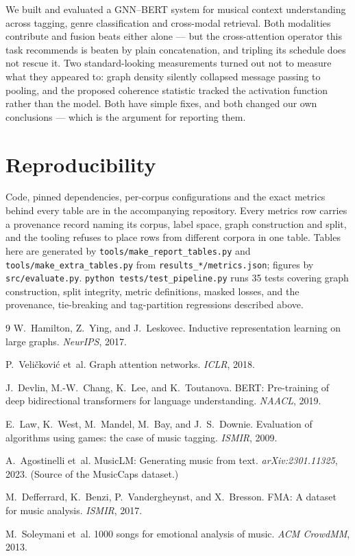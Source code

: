 \documentclass[10pt]{article}
\begin{document}
We built and evaluated a GNN--BERT system for musical context understanding
across tagging, genre classification and cross-modal retrieval. Both modalities
contribute and fusion beats either alone --- but the cross-attention operator
this task recommends is beaten by plain concatenation, and tripling its schedule
does not rescue it. Two standard-looking measurements turned out not to measure
what they appeared to: graph density silently collapsed message passing to
pooling, and the proposed coherence statistic tracked the activation function
rather than the model. Both have simple fixes, and both changed our own
conclusions --- which is the argument for reporting them.

\vspace{-0.3em}
\section*{Reproducibility}

Code, pinned dependencies, per-corpus configurations and the exact metrics
behind every table are in the accompanying repository. Every metrics row carries
a provenance record naming its corpus, label space, graph construction and
split, and the tooling refuses to place rows from different corpora in one table.
Tables here are generated by \texttt{tools/make\_report\_tables.py} and
\texttt{tools/make\_extra\_tables.py} from \texttt{results\_*/metrics.json};
figures by \texttt{src/evaluate.py}. \texttt{python tests/test\_pipeline.py} runs
35 tests covering graph construction, split integrity, metric definitions, masked
losses, and the provenance, tie-breaking and tag-partition regressions described
above.

\vspace{-0.3em}
{\small
\begin{thebibliography}{9}\itemsep0pt \parskip0pt
W.~Hamilton, Z.~Ying, and J.~Leskovec.
Inductive representation learning on large graphs. \emph{NeurIPS}, 2017.

P.~Veli\v{c}kovi\'{c} et~al. Graph attention networks. \emph{ICLR}, 2018.

J.~Devlin, M.-W.~Chang, K.~Lee, and K.~Toutanova.
{BERT}: Pre-training of deep bidirectional transformers for language
understanding. \emph{NAACL}, 2019.

E.~Law, K.~West, M.~Mandel, M.~Bay, and J.~S.~Downie.
Evaluation of algorithms using games: the case of music tagging.
\emph{ISMIR}, 2009.

A.~Agostinelli et~al. {MusicLM}: Generating music from text.
\emph{arXiv:2301.11325}, 2023. (Source of the MusicCaps dataset.)

M.~Defferrard, K.~Benzi, P.~Vandergheynst, and X.~Bresson.
{FMA}: A dataset for music analysis. \emph{ISMIR}, 2017.

M.~Soleymani et~al. 1000 songs for emotional analysis of music.
\emph{ACM CrowdMM}, 2013.
\end{thebibliography}
}
\end{document}
